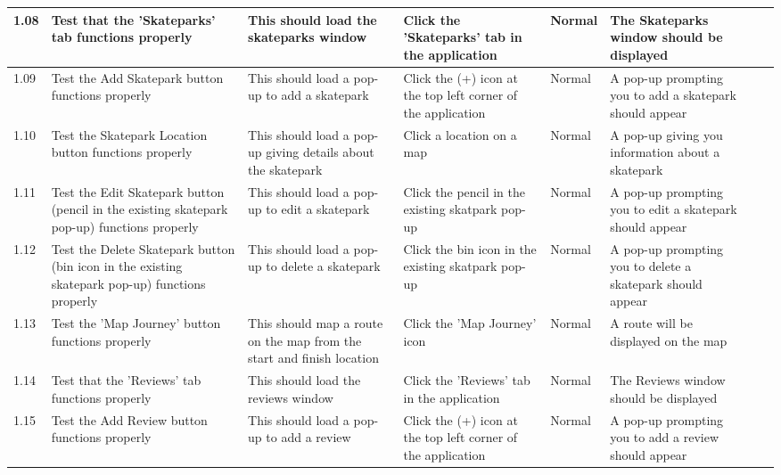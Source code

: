 \begin{landscape}
\begin{center}
\begin{longtable}{|p{1.5cm}|p{2.5cm}|p{2.5cm}|p{2cm}|p{2cm}|p{2cm}|p{2cm}|p{2cm}|}
1.08 & Test that the 'Skateparks' tab functions properly & This should load the skateparks window &Click the 'Skateparks' tab in the application & Normal & The Skateparks window should be displayed & & \\ \hline

1.09 & Test the Add Skatepark button functions properly &  This should load a pop-up to add a skatepark & Click the (+) icon at the top left corner of the application & Normal & A pop-up prompting you to add a skatepark should appear & &  \\ \hline

1.10 & Test the Skatepark Location button functions properly & This should load a pop-up giving details about the skatepark & Click a location on a map & Normal & A pop-up giving you information about a skatepark & & \\ \hline

1.11 & Test the Edit Skatepark button (pencil in the existing skatepark pop-up) functions properly & This should load a pop-up to edit a skatepark & Click the pencil in the existing skatpark pop-up & Normal & A pop-up prompting you to edit a skatepark should appear &  & \\ \hline

1.12 &  Test the Delete Skatepark button (bin icon in the existing skatepark pop-up) functions properly & This should load a pop-up to delete a skatepark & Click the bin icon in the existing skatpark pop-up & Normal & A pop-up prompting you to delete a skatepark should appear & & \\ \hline

1.13 & Test the 'Map Journey' button functions properly & This should map a route on the map from the start and finish location &  Click the 'Map Journey' icon & Normal & A route will be displayed on the map &  \\ \hline



1.14 & Test that the 'Reviews' tab functions properly & This should load the reviews window & Click the 'Reviews' tab in the application & Normal & The Reviews window should be displayed & &  \\ \hline

1.15 & Test the Add Review button functions properly &  This should load a pop-up to add a review & Click the (+) icon at the top left corner of the application & Normal & A pop-up prompting you to add a review should appear & &  \\ \hline


\end{longtable}
\end{center}
\end{landscape}
